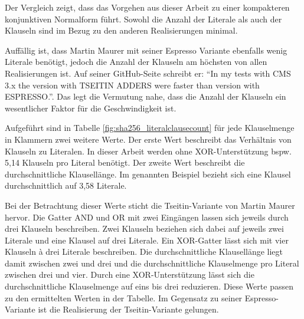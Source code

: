 Der Vergleich zeigt, dass das Vorgehen aus dieser Arbeit zu einer kompakteren konjunktiven Normalform führt.
Sowohl die Anzahl der Literale als auch der Klauseln sind im Bezug zu den anderen Realisierungen minimal.

Auffällig ist, dass Martin Maurer mit seiner Espresso Variante ebenfalls wenig Literale benötigt, jedoch die
Anzahl der Klauseln am höchsten von allen Realisierungen ist. Auf seiner GitHub-Seite \cite{capiman} schreibt
er: "`In my tests with CMS 3.x the version with TSEITIN ADDERS were faster than version with ESPRESSO."'.
Das legt die Vermutung nahe, dass die Anzahl der Klauseln ein wesentlicher Faktor für die Geschwindigkeit ist.

Aufgeführt sind in Tabelle \ref{fig:sha256_literalclausecount} für jede Klauselmenge in Klammern zwei weitere Werte.
Der erste Wert beschreibt das Verhältnis von Klauseln zu Literalen. In dieser Arbeit werden ohne XOR-Unterstützung
bspw. 5,14 Klauseln pro Literal benötigt. Der zweite Wert beschreibt die durchschnittliche Klausellänge.
Im genannten Beispiel bezieht sich eine Klausel durchschnittlich auf 3,58 Literale.

Bei der Betrachtung dieser Werte sticht die Tseitin-Variante von Martin Maurer hervor. Die Gatter AND und OR mit
zwei Eingängen lassen sich jeweils durch drei Klauseln beschreiben. Zwei Klauseln beziehen sich dabei auf jeweils
zwei Literale und eine Klausel auf drei Literale. Ein XOR-Gatter lässt sich mit vier Klauseln à drei Literale beschreiben.
Die durchschnittliche Klausellänge liegt damit zwischen zwei und drei und die durchschnittliche Klauselmenge pro Literal
zwischen drei und vier. Durch eine XOR-Unterstützung lässt sich die durchschnittliche Klauselmenge auf eins bis drei
reduzieren. Diese Werte passen zu den ermittelten Werten in der Tabelle. Im Gegensatz zu seiner Espresso-Variante ist
die Realisierung der Tseitin-Variante gelungen.